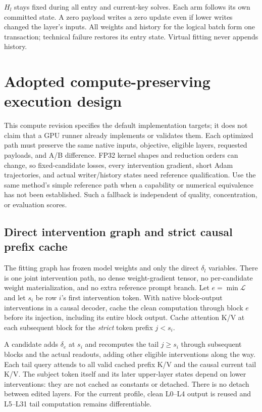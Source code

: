 \documentclass[11pt]{article}
\newcommand{\Lset}{\mathcal L}
\begin{document}
$H_l$ stays fixed during all entry and current-key solves. Each arm follows
its own committed state. A zero payload writes a zero update even if lower
writes changed the layer's inputs. All weights and history for the logical
batch form one transaction; technical failure restores its entry state.
Virtual fitting never appends history.

\clearpage
\section{Adopted compute-preserving execution design}

This compute revision specifies the default implementation targets; it does
not claim that a GPU runner already implements or validates them. Each
optimized path must preserve the same native inputs, objective, eligible
layers, requested payloads, and A/B difference. FP32 kernel shapes and
reduction orders can change, so fixed-candidate losses, every intervention
gradient, short Adam trajectories, and actual writer/history states need
reference qualification. Use the same method's simple reference path when
a capability or numerical equivalence has not been established. Such a
fallback is independent of quality, concentration, or evaluation scores.

\subsection{Direct intervention graph and strict causal prefix cache}

The fitting graph has frozen model weights and only the direct $\delta_l$
variables. There is one joint intervention path, no dense weight-gradient
tensor, no per-candidate weight materialization, and no extra reference
prompt branch. Let $e=\min\Lset$ and let $s_i$ be row $i$'s first intervention
token. With native block-output interventions in a causal decoder, cache
the clean computation through block $e$ before its injection, including its
entire block output. Cache attention K/V at each subsequent block for the
\emph{strict} token prefix $j<s_i$.

A candidate adds $\delta_e$ at $s_i$ and recomputes the tail $j\geq s_i$
through subsequent blocks and the actual readouts, adding other eligible
interventions along the way. Each tail query attends to all valid cached
prefix K/V and the causal current tail K/V. The subject token itself and
its later upper-layer states depend on lower interventions: they are not
cached as constants or detached. There is no detach between edited layers.
For the current profile, clean L0--L4 output is reused and L5--L31 tail
computation remains differentiable.
\end{document}
